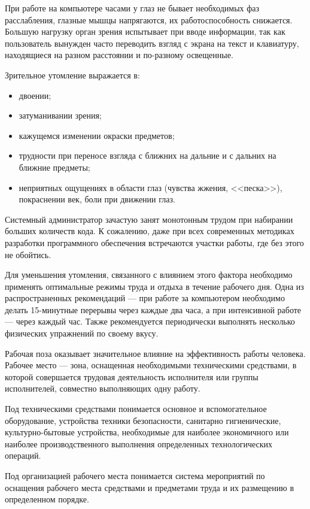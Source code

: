 При работе на компьютере часами у глаз не бывает необходимых фаз расслабления, глазные мышцы напрягаются, их работоспособность снижается. Большую нагрузку орган зрения испытывает при вводе информации, так как пользователь вынужден часто переводить взгляд с экрана на текст и клавиатуру, находящиеся на разном расстоянии и по-разному освещенные. 

Зрительное утомление выражается в:

\begin{itemize}
  \item двоении;
  \item затуманивании зрения;
  \item кажущемся изменении окраски предметов;
  \item трудности при переносе взгляда с ближних на дальние и с дальних на ближние предметы;
  \item неприятных ощущениях в области глаз (чувства жжения, <<песка>>), покраснении век, боли при движении глаз.
\end{itemize}

Системный администратор зачастую занят монотонным трудом при набирании больших количеств кода. К сожалению, даже при всех современных методиках разработки программного обеспечения встречаются участки работы, где без этого не обойтись. 

Для уменьшения утомления, связанного с влиянием этого фактора необходимо применять оптимальные режимы труда и отдыха в течение рабочего дня. Одна из распространенных рекомендаций --- при работе за компьютером необходимо делать 15-минутные перерывы через каждые два часа, а при интенсивной работе --- через каждый час. Также рекомендуется периодически выполнять несколько физических упражнений по своему вкусу.

Рабочая поза оказывает значительное влияние на эффективность работы человека. Рабочее место --- зона, оснащенная необходимыми техническими средствами, в которой совершается трудовая деятельность исполнителя или группы исполнителей, совместно выполняющих одну работу.

Под техническими средствами понимается основное и вспомогательное оборудование, устройства техники безопасности, санитарно гигиенические, культурно-бытовые устройства, необходимые для наиболее экономичного или наиболее производственного выполнения определенных технологических операций.

Под организацией рабочего места понимается система мероприятий по оснащения рабочего места средствами и предметами труда и их размещению в определенном порядке.

